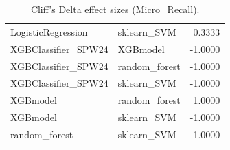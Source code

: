 \begin{table}[t]
\begin{tabular}{llr}
LogisticRegression & sklearn_SVM & 0.3333 \\
XGBClassifier_SPW24 & XGBmodel & -1.0000 \\
XGBClassifier_SPW24 & random_forest & -1.0000 \\
XGBClassifier_SPW24 & sklearn_SVM & -1.0000 \\
XGBmodel & random_forest & 1.0000 \\
XGBmodel & sklearn_SVM & -1.0000 \\
random_forest & sklearn_SVM & -1.0000 \\
\bottomrule
\end{tabular}
\caption{Cliff's Delta effect sizes (Micro_Recall).}
\label{tab:cliffs_Micro_Recall}
\end{table}